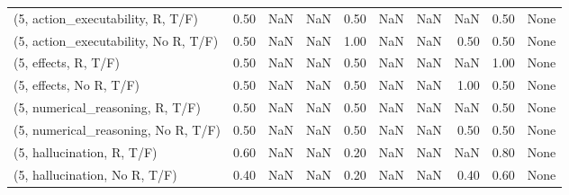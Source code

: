 \begin{table*}[h!]
\begin{adjustbox}{width=2\columnwidth,center}
\begin{tabular}{lrrr|rrr|rrr}
(5, action\_executability, R, T/F)    &                      0.50 &                   NaN &                       NaN &                          0.50 &                       NaN &                           NaN &                                    NaN &                               0.50 &                                  None \\
(5, action\_executability, No R, T/F) &                      0.50 &                   NaN &                       NaN &                          1.00 &                       NaN &                           NaN &                                   0.50 &                               0.50 &                                  None \\
(5, effects, R, T/F)                 &                      0.50 &                   NaN &                       NaN &                          0.50 &                       NaN &                           NaN &                                    NaN &                               1.00 &                                  None \\
(5, effects, No R, T/F)              &                      0.50 &                   NaN &                       NaN &                          0.50 &                       NaN &                           NaN &                                   1.00 &                               0.50 &                                  None \\
(5, numerical\_reasoning, R, T/F)     &                      0.50 &                   NaN &                       NaN &                          0.50 &                       NaN &                           NaN &                                    NaN &                               0.50 &                                  None \\
(5, numerical\_reasoning, No R, T/F)  &                      0.50 &                   NaN &                       NaN &                          0.50 &                       NaN &                           NaN &                                   0.50 &                               0.50 &                                  None \\
(5, hallucination, R, T/F)           &                      0.60 &                   NaN &                       NaN &                          0.20 &                       NaN &                           NaN &                                    NaN &                               0.80 &                                  None \\
(5, hallucination, No R, T/F)        &                      0.40 &                   NaN &                       NaN &                          0.20 &                       NaN &                           NaN &                                   0.40 &                               0.60 &                                  None \\

\end{tabular}
\end{adjustbox}
\end{table*}
